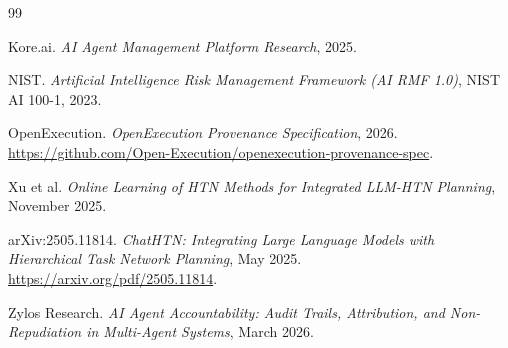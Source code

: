 \begin{thebibliography}{99}
%
\item Kore.ai. \emph{AI Agent Management Platform Research}, 2025.
%
\item NIST. \emph{Artificial Intelligence Risk Management Framework (AI RMF 1.0)}, NIST AI 100-1, 2023.
%
\item OpenExecution. \emph{OpenExecution Provenance Specification}, 2026. \url{https://github.com/Open-Execution/openexecution-provenance-spec}.
%
\item Xu et al. \emph{Online Learning of HTN Methods for Integrated LLM-HTN Planning}, November 2025.
%
\item arXiv:2505.11814. \emph{ChatHTN: Integrating Large Language Models with Hierarchical Task Network Planning}, May 2025. \url{https://arxiv.org/pdf/2505.11814}.
%
\item Zylos Research. \emph{AI Agent Accountability: Audit Trails, Attribution, and Non-Repudiation in Multi-Agent Systems}, March 2026.
%
\end{thebibliography}
